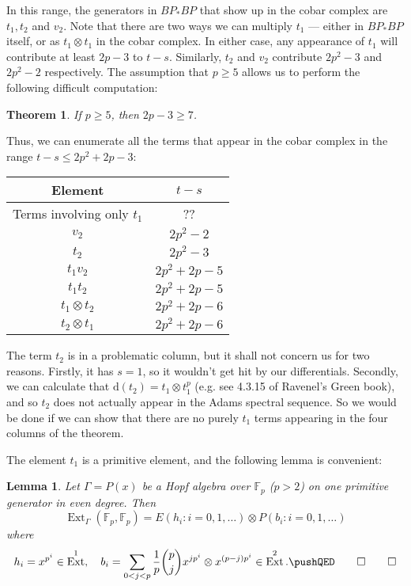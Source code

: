 \documentclass{shortart}
\newtheorem*{thm}{Theorem}
\newtheorem*{lemma}{Lemma}
\theoremstyle{definition}
\newcommand\dd{\mathrm{d}}
\newcommand\F{\mathbb{F}}
\DeclareMathOperator\Ext{Ext}
\begin{document}
In this range, the generators in $BP_*BP$ that show up in the cobar complex are $t_1, t_2$ and $v_2$. Note that there are two ways we can multiply $t_1$ --- either in $BP_* BP$ itself, or as $t_1 \otimes t_1$ in the cobar complex. In either case, any appearance of $t_1$ will contribute at least $2p - 3$ to $t - s$. Similarly, $t_2$ and $v_2$ contribute $2p^2 - 3$ and $2p^2 - 2$ respectively. The assumption that $p \geq 5$ allows us to perform the following difficult computation:

\begin{thm}
  If $p \geq 5$, then $2p - 3 \geq 7$.\fakeqed
\end{thm}

Thus, we can enumerate all the terms that appear in the cobar complex in the range $t - s \leq 2p^2 + 2p - 3$:
\begin{center}
  \begin{tabular}{cc}
    \toprule
    Element & $t - s$\\
    \midrule
    Terms involving only $t_1$ & ?? \\
    $v_2$ & $2p^2 - 2$\\
    $t_2$ & $2p^2 - 3$\\
    $t_1 v_2$ & $2p^2 + 2p - 5$\\
    $t_1 t_2$ & $2p^2 + 2p - 5$ \\
    $t_1 \otimes t_2$ & $2p^2 + 2p - 6$\\
    $t_2 \otimes t_1$ & $2p^2 + 2p - 6$\\
    \bottomrule
  \end{tabular}
\end{center}

The term $t_2$ is in a problematic column, but it shall not concern us for two reasons. Firstly, it has $s = 1$, so it wouldn't get hit by our differentials. Secondly, we can calculate that $\dd (t_2) = t_1 \otimes t_1^p$ (e.g. see 4.3.15 of Ravenel's Green book), and so $t_2$ does not actually appear in the Adams spectral sequence. So we would be done if we can show that there are no purely $t_1$ terms appearing in the four columns of the theorem.

The element $t_1$ is a primitive element, and the following lemma is convenient:
\begin{lemma}
  Let $\Gamma = P(x)$ be a Hopf algebra over $\F_p$ ($p > 2$) on one primitive generator in even degree. Then
  \[
    \Ext_\Gamma(\F_p, \F_p) = E(h_i: i = 0, 1, \ldots) \otimes P(b_i: i = 0, 1, \ldots)
  \]
  where
  \[
    h_i = x^{p^i} \in \Ext^1,\quad b_i = \sum_{0 < j < p} \frac{1}{p} \binom{p}{j} x^{jp^i} \otimes x^{(p - j)p^i} \in \Ext^2.\fakeqed
  \]\ifplastex\fakeqed\fi
\end{lemma}
\end{document}
